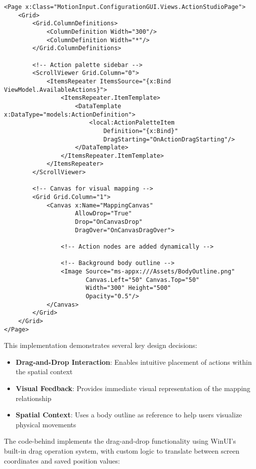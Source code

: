 \begin{verbatim}
<Page x:Class="MotionInput.ConfigurationGUI.Views.ActionStudioPage">
    <Grid>
        <Grid.ColumnDefinitions>
            <ColumnDefinition Width="300"/>
            <ColumnDefinition Width="*"/>
        </Grid.ColumnDefinitions>
        
        <!-- Action palette sidebar -->
        <ScrollViewer Grid.Column="0">
            <ItemsRepeater ItemsSource="{x:Bind ViewModel.AvailableActions}">
                <ItemsRepeater.ItemTemplate>
                    <DataTemplate x:DataType="models:ActionDefinition">
                        <local:ActionPaletteItem 
                            Definition="{x:Bind}"
                            DragStarting="OnActionDragStarting"/>
                    </DataTemplate>
                </ItemsRepeater.ItemTemplate>
            </ItemsRepeater>
        </ScrollViewer>
        
        <!-- Canvas for visual mapping -->
        <Grid Grid.Column="1">
            <Canvas x:Name="MappingCanvas" 
                    AllowDrop="True"
                    Drop="OnCanvasDrop"
                    DragOver="OnCanvasDragOver">
                
                <!-- Action nodes are added dynamically -->
                
                <!-- Background body outline -->
                <Image Source="ms-appx:///Assets/BodyOutline.png" 
                       Canvas.Left="50" Canvas.Top="50" 
                       Width="300" Height="500"
                       Opacity="0.5"/>
            </Canvas>
        </Grid>
    </Grid>
</Page>
\end{verbatim}

This implementation demonstrates several key design decisions:

\begin{itemize}
    \item \textbf{Drag-and-Drop Interaction}: Enables intuitive placement of actions within the spatial context
    \item \textbf{Visual Feedback}: Provides immediate visual representation of the mapping relationship
    \item \textbf{Spatial Context}: Uses a body outline as reference to help users visualize physical movements
\end{itemize}

The code-behind implements the drag-and-drop functionality using WinUI's built-in drag operation system, with custom logic to translate between screen coordinates and saved position values:

